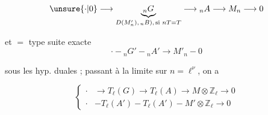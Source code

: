 \[\unsure{\cdot|0}\longrightarrow\underbrace{{}_nG}_{D(M'_n),\,{}_nB),\,\text{si }nT=T}\longrightarrow{}_nA\longrightarrow M_n\longrightarrow 0\]

et  $=$ type suite exacte
\[\cdot\mathbin{-}{}_nG'\mathbin{-}{}_nA'\longrightarrow M'_n\mathbin{-}0\]

sous les hyp. duales ; passant à la limite sur $n=\ell^\nu$, on a

\[\left\{\begin{aligned}
\cdot&\longrightarrow T_\ell(G)\longrightarrow T_\ell(A)\longrightarrow M\otimes\mathbb Z_\ell\longrightarrow 0\\
\cdot&\mathbin{-}T_\ell(A')\mathbin{-}T_\ell(A')\mathbin{-}M'\otimes\mathbb Z_\ell\longrightarrow 0
\end{aligned}\right.\]
